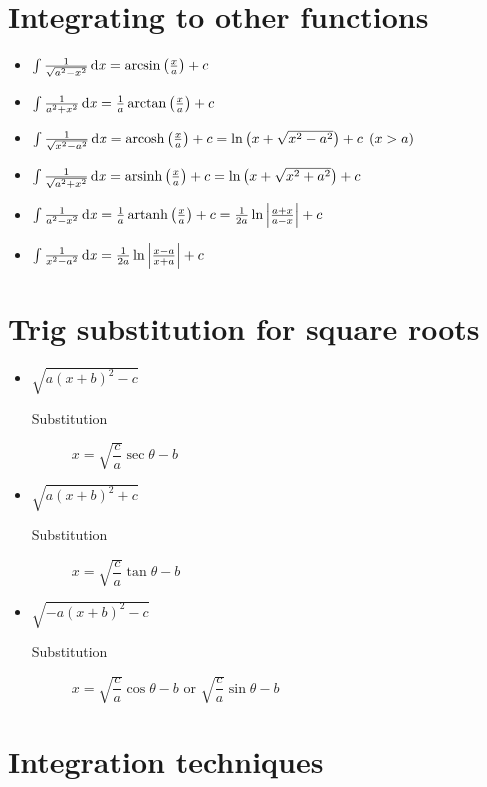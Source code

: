 \section{Integrating to other functions}
\begin{itemize}
    \item $\int \frac{1}{\sqrt{a^2-x^2}} \operatorname{\mathrm{d}\mathit{x}}=\arcsin \left(\frac{x}{a}\right) + c $
    \item $\int \frac{1}{a^2+x^2} \operatorname{\mathrm{d}\mathit{x}}= \frac{1}{a}\arctan \left(\frac{x}{a}\right) + c $
    \item $\int \frac{1}{\sqrt{x^2-a^2}} \operatorname{\mathrm{d}\mathit{x}}= \operatorname{arcosh} \left(\frac{x}{a}\right) + c = \ln \left(x + \sqrt{x^2-a^2}\right) + c \:\:  (x>a)$
    \item $\int \frac{1}{\sqrt{a^2+x^2}} \operatorname{\mathrm{d}\mathit{x}}= \operatorname{arsinh} \left(\frac{x}{a}\right) + c = \ln \left(x + \sqrt{x^2+a^2}\right) + c $
    \item $\int \frac{1}{a^2-x^2} \operatorname{\mathrm{d}\mathit{x}}=\frac{1}{a}\operatorname{artanh} \left(\frac{x}{a}\right) + c = \frac{1}{2a}\ln \left|\frac{a+x}{a-x}\right| + c$
    \item $\int \frac{1}{x^2-a^2} \operatorname{\mathrm{d}\mathit{x}}= \frac{1}{2a}\ln \left|\frac{x-a}{x+a}\right| + c$
\end{itemize}

\section{Trig substitution for square roots}
\begin{itemize}
    \item $\sqrt{a(x+b)^2-c}$
    \begin{description}
        \item[Substitution] $x = \sqrt{\dfrac{c}{a}}\sec\theta - b$
    \end{description}
    \item $\sqrt{a(x+b)^2+c}$
    \begin{description}
        \item[Substitution] $x = \sqrt{\dfrac{c}{a}}\tan\theta - b$
    \end{description}
    \item $\sqrt{-a(x+b)^2-c}$
    \begin{description}
        \item[Substitution] $x = \sqrt{\dfrac{c}{a}}\cos\theta - b$ or $\sqrt{\dfrac{c}{a}}\sin\theta - b$
    \end{description}
\end{itemize}

\section{Integration techniques}
